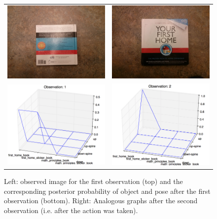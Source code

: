     \begin{figure}
    \begin{tabular}{cc}
    	\includegraphics[width = 0.39\columnwidth]{pics/obs1.jpg} &
 		  \includegraphics[width = 0.39\columnwidth]{pics/obs2.jpg} \\
  		\includegraphics[width = 0.5\columnwidth]{pics/experimentObs1.png} &
   		\includegraphics[width = 0.5\columnwidth]{pics/experimentObs2.png}
		\end{tabular}
	\caption{ Left: observed image for the first observation (top) and the corresponding posterior probability of object and pose after the first observation (bottom).	Right: Analogous graphs after the second observation (i.e. after the action was taken).}
    	\label{fig:posteriors}
    \end{figure}

